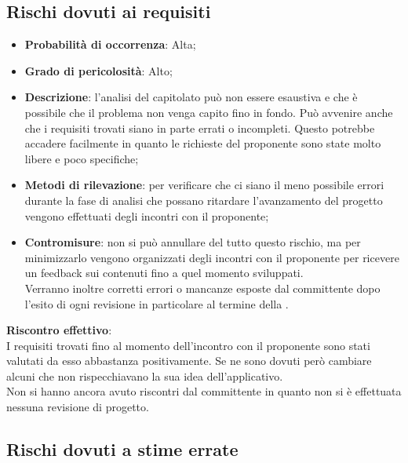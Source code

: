 		
	\subsection{Rischi dovuti ai requisiti} %
	\label{sub:rischi_dovuti_ai_requisiti}
		\begin{itemize}
			\item \textbf{Probabilità di occorrenza}: Alta;
			\item \textbf{Grado di pericolosità}: Alto;
			\item \textbf{Descrizione}: l'analisi del capitolato può non essere esaustiva e che è possibile che il problema non venga capito fino in fondo. Può avvenire anche che i requisiti trovati siano in parte errati o incompleti. Questo potrebbe accadere facilmente in quanto le richieste del proponente sono state molto libere e poco specifiche;
			\item \textbf{Metodi di rilevazione}: per verificare che ci siano il meno possibile errori durante la fase di analisi che possano ritardare l'avanzamento del progetto vengono effettuati degli incontri con il proponente;
			\item \textbf{Contromisure}: non si può annullare del tutto questo rischio, ma per minimizzarlo vengono organizzati degli incontri con il proponente per ricevere un feedback sui contenuti fino a quel momento sviluppati. \\
			Verranno inoltre corretti errori o mancanze esposte dal committente dopo l'esito di ogni revisione in particolare al termine della \RR.			
		\end{itemize}
	\noindent
	\textbf{Riscontro effettivo}: \\
	I requisiti trovati fino al momento dell'incontro con il proponente sono stati valutati da esso abbastanza positivamente. Se ne sono dovuti però cambiare alcuni che non rispecchiavano la sua idea dell'applicativo.  \\
	Non si hanno ancora avuto riscontri dal committente in quanto non si è effettuata nessuna revisione di progetto.
	
	\subsection{Rischi dovuti a stime errate} %
	\label{sub:rischi_dovuti_a_stime_errate}
